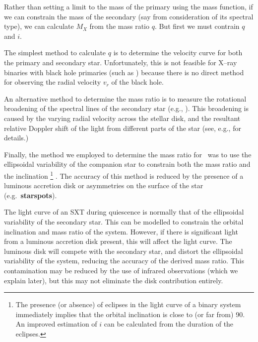 Rather than setting a limit to the mass of the primary using the mass
function, if we can constrain the mass of the secondary (say from
consideration of its spectral type), we can calculate $M_{X}$ from the
mass ratio $q$. But first we must contrain $q$ and $i$. %

\vspace{\myparskip}

The simplest method to calculate $q$ is to determine the velocity
curve for both the primary and secondary star. Unfortunately, this is
not feasible for X--ray binaries with black hole primaries (such as \groj) because there is no direct method for observing the radial velocity $v_r$ of the black hole. %

\vspace{\myparskip}

An alternative method to determine the mass ratio is to measure the rotational broadening of the spectral lines of the secondary star (e.g., %
%
). This broadening is caused by the varying radial velocity across the
stellar disk, and the resultant relative Doppler shift of the light
from different parts of the star (see, e.g., %
for details.) %

\vspace{\myparskip}

Finally, the method we employed to determine the mass ratio for \groj\ was to use the ellipsoidal variability of the companion star to constrain
both the mass ratio and the inclination%
\footnote{
\label{cha:Introduction:sec:X--rayBinaries:subsec:DeterminingTheMassOfThePrimary:foot:inc}
The presence (or absence) of eclipses in the light curve of a binary system
immediately implies that the orbital inclination is close to (or far from) 90\degr. An improved estimation of $i$ can be calculated from the
duration of the eclipses. %
}%
. The accuracy of this method is
reduced by the presence of a luminous accretion disk or asymmetries on the surface of the star
(e.g.\ \textbf{starspots}). %

\vspace{\myparskip}

The light curve of an SXT during quiescence is normally that of the ellipsoidal variability of the secondary star. This can be modelled to constrain the orbital inclination and mass ratio of the system. However, if there is significant light from a luminous accretion disk
present, this will affect the light curve. The luminous disk will compete with the secondary star, and distort the ellipsoidal variability of the system, reducing the accuracy of the derived mass ratio. This contamination may be reduced by the use of infrared observations (which we explain later), but this may not eliminate the disk contribution entirely.

